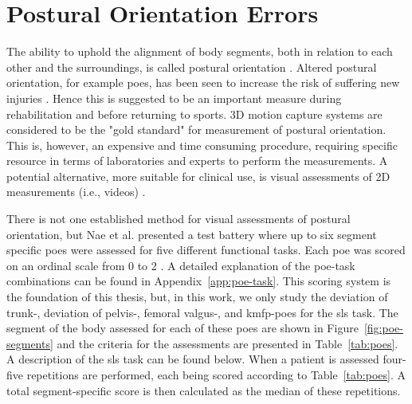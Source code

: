
\section{Postural Orientation Errors}
The ability to uphold the alignment of body segments, both in relation to each other and the surroundings, is called postural orientation \cite{Horak2006}. Altered postural orientation, for example \glspl{poe}, has been seen to increase the risk of suffering new injuries \cite{Hewett2005}. Hence this is suggested to be an important measure during rehabilitation and before returning to sports. 3D motion capture systems are considered to be the "gold standard" for measurement of postural orientation. This is, however, an expensive and time consuming procedure, requiring specific resource in terms of laboratories and experts to perform the measurements. A potential alternative, more suitable for clinical use, is visual assessments of 2D measurements (i.e., videos) \cite{Nae2020}.

There is not one established method for visual assessments of postural orientation, but Nae et al. presented a test battery where up to six segment specific \glspl{poe} were assessed for five different functional tasks. Each \gls{poe} was scored on an ordinal scale from 0 to 2 \cite{Nae2017, Nae2020b}.
A detailed explanation of the \gls{poe}-task combinations can be found in Appendix~\ref{app:poe-task}. This scoring system is the foundation of this thesis, but, in this work, we only study the deviation of trunk-, deviation of pelvis-, femoral valgus-, and \gls{kmfp}-\glspl{poe} for the \gls{sls} task.
The segment of the body assessed for each of these \glspl{poe} are shown in Figure~\ref{fig:poe-segments} and the criteria for the assessments are presented in Table~\ref{tab:poes}. A description of the \gls{sls} task can be found below. When a patient is assessed four-five repetitions are performed, each being scored according to Table~\ref{tab:poes}. A total segment-specific score is then calculated as the median of these repetitions.

